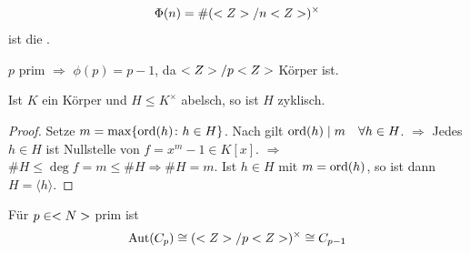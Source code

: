 \begin{definition}
	\begin{align}
		\Phi(n) = \#(<Z>/n<Z>)^\times\notag
	\end{align}
	ist die .
\end{definition}

\begin{example}
	$p$ prim $\Rightarrow$ $\phi(p) = p-1$, da $<Z> / p<Z>$ Körper ist.
\end{example}

\begin{proposition}
	Ist $K$ ein Körper und $H\leq K^{\times}$ abelsch, so ist $H$ zyklisch.
\end{proposition}
\begin{proof}
	Setze $m=\max\{\operatorname{ord}(h) \colon h \in H\}$. Nach  gilt $\operatorname{ord}(h) \mid m \quad\forall h \in H$. $\Rightarrow$ Jedes $h \in H$ ist Nullstelle von $f = x^m -1 \in K[x]$. $\Rightarrow$ $\# H \leq \deg f = m \leq \# H \Rightarrow \# H = m$. Ist $h \in H$ mit $m = \operatorname{ord}(h)$, so ist dann $H = \langle h \rangle$.
\end{proof}

\begin{conclusion}
	Für $p \in <N>$ prim ist
	\begin{align}
		\operatorname{Aut}(C_p) \cong (<Z> / p <Z>)^{\times} \cong C_{p-1}\notag
	\end{align}
\end{conclusion}